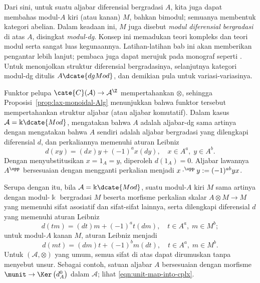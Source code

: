 Dari sini, untuk suatu aljabar diferensial bergradasi $A$, kita juga dapat
membahas modul-$A$ kiri (atau kanan) $M$, bahkan bimodul; semuanya membentuk
kategori abelian. Dalam keadaan ini, $M$ juga disebut \emph{modul diferensial
bergradasi} di atas $A$, disingkat \emph{modul-dg}. Konsep ini memadukan teori
kompleks dan teori modul serta sangat luas kegunaannya. Latihan-latihan bab
ini akan memberikan pengantar lebih lanjut; pembaca juga dapat merujuk pada
monograf seperti \cite{Yek20}. Untuk menonjolkan struktur diferensial
bergradasinya, selanjutnya kategori modul-dg ditulis $A\dcate{dgMod}$, dan
demikian pula untuk variasi-variasinya.

Funktor pelupa $\cate{C}(\mathcal{A})\to\mathcal{A}^{\Z}$ mempertahankan
$\otimes$, sehingga Proposisi~\ref{prop:lax-monoidal-Alg} menunjukkan bahwa
funktor tersebut mempertahankan struktur aljabar (atau aljabar komutatif).
Dalam kasus $\mathcal{A}=\Bbbk\dcate{Mod}$, mengatakan bahwa $A$ adalah
aljabar-dg sama artinya dengan mengatakan bahwa $A$ sendiri adalah aljabar
bergradasi yang dilengkapi diferensial $d$, dan perkaliannya memenuhi aturan
Leibniz
\[ d(xy) = (dx)y + (-1)^a x (dy), \quad x \in A^a, \; y \in A^b. \]
Dengan menyubstitusikan $x=1_A=y$, diperoleh $d(1_A)=0$. Aljabar lawannya
$A^{\opp}$ bersesuaian dengan mengganti perkalian menjadi
$x\mathbin{\cdot^{\opp}}y:=(-1)^{ab}yx$.

Serupa dengan itu, bila $\mathcal{A}=\Bbbk\dcate{Mod}$, suatu modul-$A$ kiri
$M$ sama artinya dengan modul-$\Bbbk$ bergradasi $M$ beserta morfisme
perkalian skalar $A\otimes M\to M$ yang memenuhi sifat asosiatif dan
sifat-sifat lainnya, serta dilengkapi diferensial $d$ yang memenuhi aturan
Leibniz
\[ d(tm) = (dt)m + (-1)^a t (dm), \quad t \in A^a, \; m \in M^b; \]
untuk modul-$A$ kanan $M$, aturan Leibniz menjadi
\[ d(mt) = (dm)t + (-1)^b m (dt), \quad t \in A^a, \; m \in M^b. \]
Untuk $(\mathcal{A},\otimes)$ yang umum, semua sifat di atas dapat dirumuskan
tanpa menyebut unsur. Sebagai contoh, satuan aljabar $A$ bersesuaian dengan
morfisme $\munit\to\Ker\left(d_A^0\right)$ dalam $\mathcal{A}$; lihat
\eqref{eqn:unit-map-into-cplx}.

